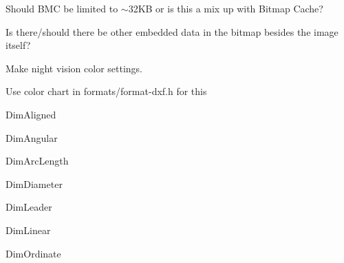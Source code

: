 \begin{DoxyRefList}
\label{todo__todo000013}%
%
Should BMC be limited to $\sim$32\+KB or is this a mix up with Bitmap Cache? 

Is there/should there be other embedded data in the bitmap besides the image itself?  
\item[Member \mbox{\hyperlink{mainwindow_8cpp_a9ae7b1e4de8bb7661879f4317d6d3cb9}{night\+\_\+vision\+\_\+action}} (String args)]\label{todo__todo000008}%
%
Make night vision color settings.  
\item[Member \mbox{\hyperlink{embroidermodder_8h_a29bcbce98e36705fa9c1577a227d53c0a21cbc22cd57ac906315fac3d245a25b9}{OBJ\+\_\+\+LTYPE}} ]\label{todo__todo000003}%
%
Use color chart in formats/format-\/dxf.\+h for this  
\item[Member \mbox{\hyperlink{classPropertyEditor_af677b799a39d2374c702087e23fb6b3c}{Property\+Editor\+::clear\+All\+Fields}} ()]\label{todo__todo000023}%
%
Dim\+Aligned 

Dim\+Angular 

Dim\+Arc\+Length 

Dim\+Diameter 

Dim\+Leader 

Dim\+Linear 

Dim\+Ordinate 


\end{DoxyRefList}
